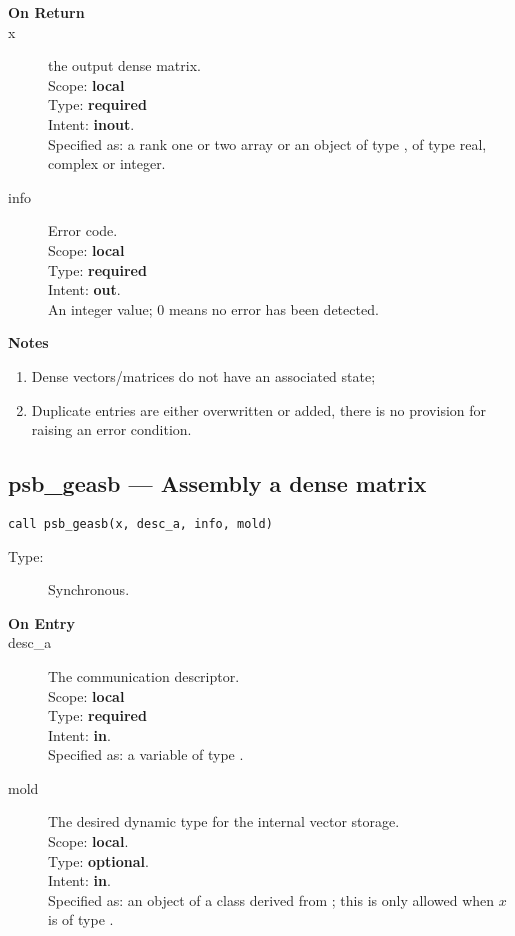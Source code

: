 \begin{description}
\item[\bf On Return]
\item[x] the output dense matrix.\\
Scope: {\bf local} \\
Type: {\bf required}\\
Intent: {\bf inout}.\\
Specified as:  a rank one or two array or an object of type \vdata, of
type real, complex or integer.\\ 
\item[info] Error code.\\
Scope: {\bf local} \\
Type: {\bf required} \\
Intent: {\bf out}.\\
An integer value; 0 means no error has been detected. 
\end{description}

{\par\noindent\large\bfseries Notes}
\begin{enumerate}
\item Dense vectors/matrices do not have an associated state;
\item Duplicate entries are either overwritten or added, there is no
  provision for raising an error condition. 
\end{enumerate}


%
%
\clearpage\subsection*{psb\_geasb --- Assembly a dense matrix}

\begin{verbatim}
call psb_geasb(x, desc_a, info, mold)
\end{verbatim}

\begin{description}
\item[Type:] Synchronous.
\item[\bf On Entry]
\item[desc\_a] The communication descriptor.\\
Scope: {\bf local} \\
Type: {\bf required}\\
Intent: {\bf in}.\\
Specified as: a variable of type \descdata.\\
\item[mold] The desired dynamic type for the internal vector storage.\\
Scope: {\bf local}.\\
Type: {\bf optional}.\\
Intent: {\bf in}.\\
Specified as: an object of a class derived from \vbasedata; this is
only allowed when $x$ is of type \vdata.
\end{description}


